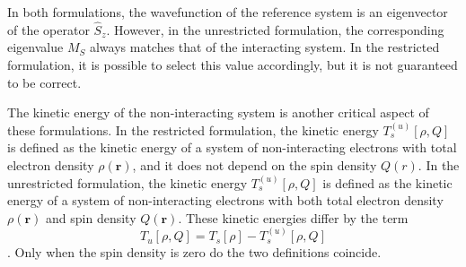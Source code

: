 \documentclass[%
 preprint, linenumbers,
 amsmath,amssymb,
 aps, physrev,
]{revtex4-2}
\begin{document}
In both formulations, the wavefunction of the reference system is an eigenvector of the operator \(\hat{S}_z\). However, in the unrestricted formulation, the corresponding eigenvalue \(M_S\) always matches that of the interacting system. In the restricted formulation, it is possible to select this value accordingly, but it is not guaranteed to be correct.

The kinetic energy of the non-interacting system is another critical aspect of these formulations. In the restricted formulation, the kinetic energy \(T_s^(u)[\rho, Q]\) is defined as the kinetic energy of a system of non-interacting electrons with total electron density \(\rho(\mathbf{r})\), and it does not depend on the spin density \(Q(r)\). In the unrestricted formulation, the kinetic energy \(T_s^{(u)}[\rho, Q]\) is defined as the kinetic energy of a system of non-interacting electrons with both total electron density \(\rho(\mathbf{r})\) and spin density \(Q(\mathbf{r})\). These kinetic energies differ by the term 
\begin{equation}
    T_u[\rho, Q] = T_s[\rho] - T_s^{(u)}[\rho, Q]
\end{equation}.
Only when the spin density is zero do the two definitions coincide.
\end{document}
